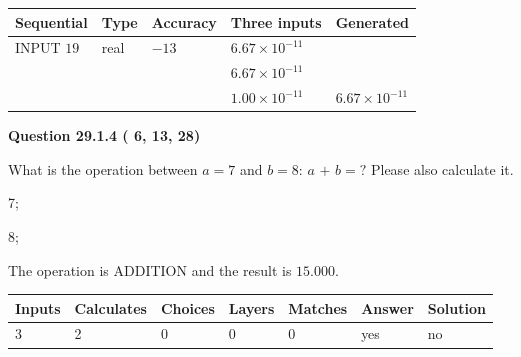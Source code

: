 \documentclass[12pt]{article}
\begin{document}
   
  
  
\noindent\begin{tabular}{|l|l|l|l|l|}
\hline
 Sequential & Type & Accuracy & Three inputs & Generated \\ 
\hline
 
 
  INPUT $          19$ & real & $         -13 $ & $
 6.67 \times 10^{-11}
  $ & \\
  & & &  $
 6.67 \times 10^{-11}
  $ & \\
  & & &  $
 1.00 \times 10^{-11}
 $ & $ 6.67 \times 10^{-11} $ 
 \\  \hline  
 \end{tabular}
   
   
  
\vspace{0.2in}
  
{\textbf{\Large{Question
29.1.4 
 (          6,         13,         28)
}}}
  
  
What is the operation between $a= %
7$ and $b= %
8$:
$a$  %
$+$ $b=?$ Please also calculate it.
 
 
\noindent{}
 
 

7;
 
8;
 
The operation is  %
ADDITION and the result is
$ %
15.000$.
 
 
 
\noindent{}
 
 

 
\vspace{0.3in}
   
   
   
   
\noindent\begin{tabular}{|l|l|l|l|l|l|l|}
 \hline
Inputs & Calculates & Choices & Layers & Matches & Answer & Solution \\ \hline
           3 & 
           2 & 
           0
  & 
           0 & 
           0 & 
  yes & 
  no 
  \\ \hline
 \end{tabular}
   
   
   
   
\noindent{}
   
   
  
\end{document}
